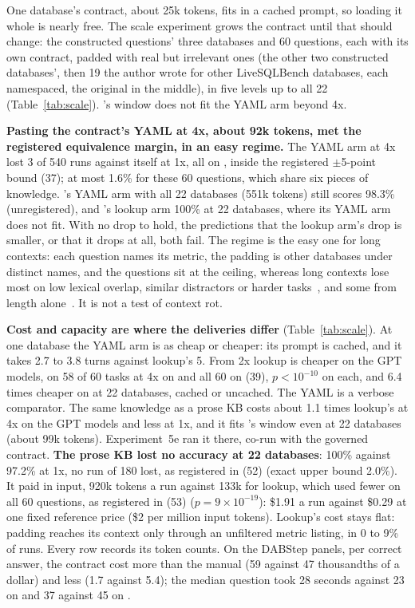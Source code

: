 One database's contract, about 25k tokens, fits in a cached prompt, so
loading it whole is nearly free. The scale experiment grows the contract
until that should change: the constructed questions' three databases and
60 questions, each with its own contract, padded with real but irrelevant
ones (the other two constructed databases', then 19 the author wrote for
other LiveSQLBench databases, each namespaced, the original in the
middle), in five levels up to all 22 (Table~\ref{tab:scale}). \mQwen{}'s
window does not fit the YAML arm beyond 4x.

\textbf{Pasting the contract's YAML at 4x, about 92k tokens, met the
registered equivalence margin, in an easy regime.} The YAML arm at 4x lost
3 of 540 runs against itself at 1x, all on \mLuna{}, inside the registered
$\pm$5-point bound (37); at most 1.6\% for these 60 questions, which share
six pieces of knowledge. \mLuna{}'s YAML arm with all 22 databases (551k
tokens) still scores 98.3\% (unregistered), and \mQwen{}'s lookup arm 100\%
at 22 databases, where its YAML arm does not fit. With no drop to hold, the
predictions that the lookup arm's drop is smaller, or that it drops at
all, both fail. The regime is the easy
one for long contexts: each question names its metric, the padding is
other databases under distinct names, and the questions sit at the
ceiling, whereas long contexts lose most on low lexical overlap, similar
distractors or harder tasks~\cite{nolima,context-rot,ruler}, and some from
length alone~\cite{context-rot,length-alone-hurts}. It is not a test of
context rot.

\textbf{Cost and capacity are where the deliveries differ}
(Table~\ref{tab:scale}). At one database the YAML arm is as cheap or
cheaper: its prompt is cached, and it takes 2.7 to 3.8 turns against
lookup's 5. From 2x lookup is cheaper on the GPT models, on 58 of 60 tasks
at 4x on \mLuna{} and all 60 on \mSol{} (39), $p{<}10^{-10}$ on each, and
6.4 times cheaper on \mLuna{} at 22 databases, cached or uncached. The
YAML is a verbose comparator. The same
knowledge as a prose KB costs about 1.1 times lookup's at 4x on the GPT
models and less at 1x, and it fits \mQwen{}'s window even at 22 databases
(about 99k tokens). Experiment~5e ran it there, co-run with the governed
contract. \textbf{The prose KB lost no accuracy at 22 databases}: 100\%
against 97.2\% at 1x, no run of 180 lost, as registered in (52) (exact
upper bound 2.0\%). It paid in input, 920k tokens a run against 133k for
lookup, which used fewer on all 60 questions, as registered in (53)
($p{=}9{\times}10^{-19}$): \$1.91 a run against \$0.29 at one fixed
reference price (\$2 per million input tokens). Lookup's cost stays flat:
padding reaches its context only through an unfiltered metric listing, in
0 to 9\% of runs. Every row records its token counts.
\ifextended On the DABStep panels, per correct answer, the contract cost
\mSol{} more than the manual (59 against 47 thousandths of a dollar) and
\mQwen{} less (1.7 against 5.4); the median question took 28 seconds
against 23 on \mSol{} and 37 against 45 on \mQwen{}.\fi

